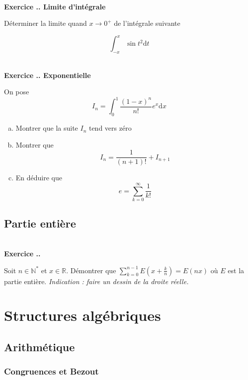 \documentclass{article}
\newcommand{\di}{\mathrm{d}}
\newcommand{\mb}[1]{\mathbb{#1}}
\newcounter{exo}
\newcommand{\exercice}[1][\null]{\textbf{\\ Exercice \thesection.\theexo. #1} \addtocounter{exo}{1}}
\begin{document}
\exercice[Limite d'intégrale]

Déterminer la limite quand $x \to 0^+$ de l'intégrale suivante

\begin{equation*}
    \int_{-x}^x \sin t^2 \di t
\end{equation*}

\exercice[Exponentielle]

On pose 
\begin{equation*}
    I_n = \int_0^1 \frac{(1 - x)^n}{n!} e^x \di x
\end{equation*}

\begin{enumerate}[(a)]
    \item Montrer que la suite $I_n$ tend vers zéro
    \item Montrer que 
        \begin{equation*}
            I_n = \frac{1}{(n+1)!} + I_{n+1}
        \end{equation*}
    \item En déduire que 
        \begin{equation*}
            e = \sum_{k = 0}^\infty \frac{1}{k!}
        \end{equation*}
\end{enumerate}



\subsection{Partie entière}


\exercice

Soit $n \in \mb{N^*}$ et $x \in \mb{R}$. Démontrer que $\displaystyle \sum_{k=0}^{n-1} E\left(x + \frac{k}{n}\right) = E(nx)$ où  $E$ est la partie entière. \emph{Indication : faire un dessin de la droite réelle.}






\section{Structures algébriques}

\subsection{Arithmétique}

\subsubsection{Congruences et Bezout}
\end{document}
